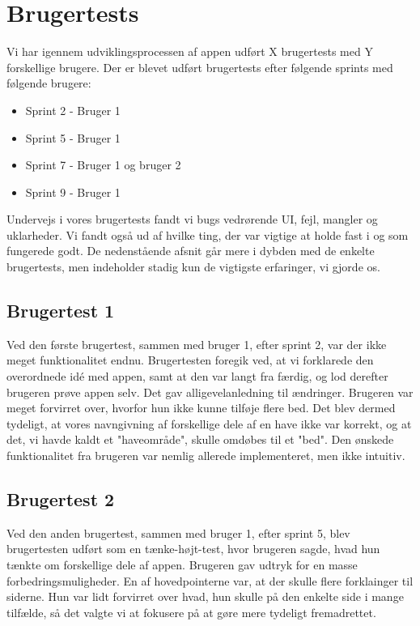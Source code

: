\section{Brugertests}
Vi har igennem udviklingsprocessen af appen udført X brugertests med Y forskellige brugere. Der er blevet udført brugertests efter følgende sprints med følgende brugere:
\begin{itemize}
    \item Sprint 2 - Bruger 1
    \item Sprint 5 - Bruger 1
    \item Sprint 7 - Bruger 1 og bruger 2
    \item Sprint 9 - Bruger 1
\end{itemize}

Undervejs i vores brugertests fandt vi bugs vedrørende UI, fejl, mangler og uklarheder. Vi fandt også ud af hvilke ting, der var vigtige at holde fast i og som fungerede godt. De nedenstående afsnit går mere i dybden med de enkelte brugertests, men indeholder stadig kun de vigtigste erfaringer, vi gjorde os.

\subsection{Brugertest 1}
Ved den første brugertest, sammen med bruger 1, efter sprint 2, var der ikke meget funktionalitet endnu. Brugertesten foregik ved, at vi forklarede den overordnede idé med appen, samt at den var langt fra færdig, og lod derefter brugeren prøve appen selv. Det gav alligevelanledning til ændringer. Brugeren var meget forvirret over, hvorfor hun ikke kunne tilføje flere bed. Det blev dermed tydeligt, at vores navngivning af forskellige dele af en have ikke var korrekt, og at det, vi havde kaldt et "haveområde", skulle omdøbes til et "bed". Den ønskede funktionalitet fra brugeren var nemlig allerede implementeret, men ikke intuitiv.

\subsection{Brugertest 2}

Ved den anden brugertest, sammen med bruger 1, efter sprint 5, blev brugertesten udført som en tænke-højt-test, hvor brugeren sagde, hvad hun tænkte om forskellige dele af appen.
Brugeren gav udtryk for en masse forbedringsmuligheder. En af hovedpointerne var, at der skulle flere forklainger til siderne. Hun var lidt forvirret over hvad, hun skulle på den enkelte side i mange tilfælde, så det valgte vi at fokusere på at gøre mere tydeligt fremadrettet.

